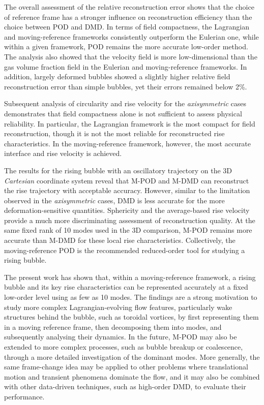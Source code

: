 \documentclass[a4paper,fleqn]{cas-sc}
\begin{document}
	The overall assessment of the relative reconstruction error shows that the choice of reference frame has a stronger influence on reconstruction efficiency than the choice between POD and DMD. In terms of field compactness, the Lagrangian and moving-reference frameworks consistently outperform the Eulerian one, while within a given framework, POD remains the more accurate low-order method. The analysis also showed that the velocity field is more low-dimensional than the gas volume fraction field in the Eulerian and moving-reference frameworks. In addition, largely deformed bubbles showed a slightly higher relative field reconstruction error than simple bubbles, yet their errors remained below 2\%. 
	
	Subsequent analysis of circularity and rise velocity for the \textit{axisymmetric} cases demonstrates that field compactness alone is not sufficient to assess physical reliability. In particular, the Lagrangian framework is the most compact for field reconstruction, though it is not the most reliable for reconstructed rise characteristics. In the moving-reference framework, however, the most accurate interface and rise velocity is achieved. 
	
	The results for the rising bubble with an oscillatory trajectory on the 3D \textit{Cartesian} coordinate system reveal that M-POD and M-DMD can reconstruct the rise trajectory with acceptable accuracy. However, similar to the limitation observed in the \textit{axisymmetric} cases, DMD is less accurate for the more deformation-sensitive quantities. Sphericity and the average-based rise velocity provide a much more discriminating assessment of reconstruction quality. At the same fixed rank of 10 modes used in the 3D comparison, M-POD remains more accurate than M-DMD for these local rise characteristics. Collectively, the moving-reference POD is the recommended reduced-order tool for studying a rising bubble.
	
	The present work has shown that, within a moving-reference framework, a rising bubble and its key rise characteristics can be represented accurately at a fixed low-order level using as few as 10 modes. The findings are a strong motivation to study more complex Lagrangian-evolving flow features, particularly wake structures behind the bubble, such as toroidal vortices, by first representing them in a moving reference frame, then decomposing them into modes, and subsequently analysing their dynamics. In the future, M-POD may also be extended to more complex processes, such as bubble breakup or coalescence, through a more detailed investigation of the dominant modes. More generally, the same frame-change idea may be applied to other problems where translational motion and transient phenomena dominate the flow, and it may also be combined with other data-driven techniques, such as high-order DMD, to evaluate their performance. \\
	
\end{document}
